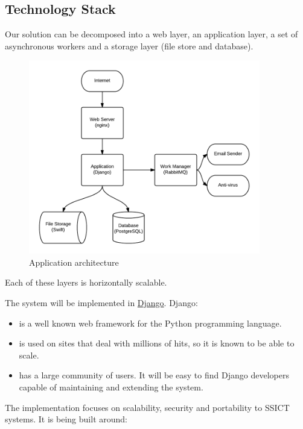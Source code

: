 \documentclass[12pt,a4paper,twosided]{article}
\begin{document}
\subsection{Technology Stack}

Our solution can be decomposed into a web layer, an application layer, a
set of asynchronous workers and a storage layer (file store and
database).

\begin{figure}[htbp]
\centering
\includegraphics[width=0.9\textwidth]{./imgs/tech-overview.png}
\caption{Application architecture}
\end{figure}

Each of these layers is horizontally scalable.

The system will be implemented in \href{http://django.org}{Django}.
Django:

\begin{itemize}
\itemsep1pt\parskip0pt
\item
  is a well known web framework for the Python programming language.
\item
  is used on sites that deal with millions of hits, so it is known to be
  able to scale.
\item
  has a large community of users. It will be easy to find Django
  developers capable of maintaining and extending the system.
\end{itemize}

The implementation focuses on scalability, security and portability to
SSICT systems. It is being built around:
\end{document}
